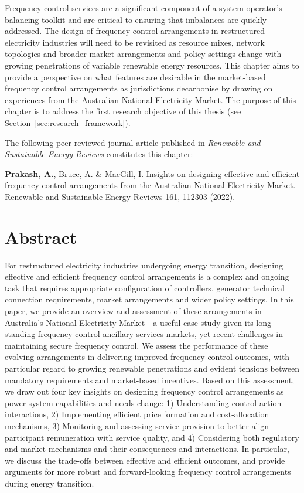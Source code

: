 \documentclass[12pt,a4paper,]{report}
\begin{document}
Frequency control services are a significant component of a system
operator's balancing toolkit and are critical to ensuring that
imbalances are quickly addressed. The design of frequency control
arrangements in restructured electricity industries will need to be
revisited as resource mixes, network topologies and broader market
arrangements and policy settings change with growing penetrations of
variable renewable energy resources. This chapter aims to provide a
perspective on what features are desirable in the market-based frequency
control arrangements as jurisdictions decarbonise by drawing on
experiences from the Australian National Electricity Market. The purpose
of this chapter is to address the first research objective of this
thesis (see Section~\ref{sec:research_framework}).

The following peer-reviewed journal article published in \emph{Renewable
and Sustainable Energy Reviews} constitutes this chapter:

\textbf{Prakash, A.}, Bruce, A. \& MacGill, I. Insights on designing
effective and efficient frequency control arrangements from the
Australian National Electricity Market. Renewable and Sustainable Energy
Reviews 161, 112303 (2022).

\hypertarget{abstract-1}{%
\section{Abstract}\label{abstract-1}}

For restructured electricity industries undergoing energy transition,
designing effective and efficient frequency control arrangements is a
complex and ongoing task that requires appropriate configuration of
controllers, generator technical connection requirements, market
arrangements and wider policy settings. In this paper, we provide an
overview and assessment of these arrangements in Australia's National
Electricity Market - a useful case study given its long-standing
frequency control ancillary services markets, yet recent challenges in
maintaining secure frequency control. We assess the performance of these
evolving arrangements in delivering improved frequency control outcomes,
with particular regard to growing renewable penetrations and evident
tensions between mandatory requirements and market-based incentives.
Based on this assessment, we draw out four key insights on designing
frequency control arrangements as power system capabilities and needs
change: 1) Understanding control action interactions, 2) Implementing
efficient price formation and cost-allocation mechanisms, 3) Monitoring
and assessing service provision to better align participant remuneration
with service quality, and 4) Considering both regulatory and market
mechanisms and their consequences and interactions. In particular, we
discuss the trade-offs between effective and efficient outcomes, and
provide arguments for more robust and forward-looking frequency control
arrangements during energy transition.
\end{document}
